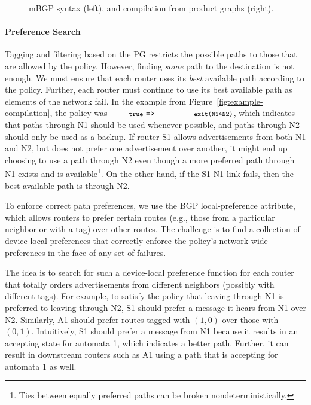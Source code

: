 \documentclass[numbers, 10pt, preprint]{sigplanconf}
\newcommand{\para}[1]{\paragraph*{\textbf{#1}}}
\newcommand{\CD}[1]{\texttt{\small #1}}
\newcommand{\KW}[1]{\texttt{\small\bfseries{#1}}}
\newcommand{\True}{\CD{true}}
\newcommand{\Prefer}{\texttt{>>}}
\newcommand{\Path}{\texttt{=>}}
\newcommand{\Exit}{\KW{exit}}
\begin{document}
\begin{figure}[t!]
  \vspace{1em}
  \hrulefill%
  \vspace{-.8em}
  \caption{mBGP syntax (left), and compilation from product graphs (right).}
  \label{fig:concretization}
  \vspace{-.4em}
\end{figure}%


\para{Preference Search}

Tagging and filtering based on the PG restricts the possible paths to those that are allowed by the policy. However, finding \emph{some} path to the destination is not enough. We must ensure that each router uses its \emph{best} available path according to the policy. Further, each router must continue to use its best available path as elements of the network fail. In the example from Figure~\ref{fig:example-compilation}, the policy was $\True ~\Path~ \CD{\Exit(N1\Prefer N2)}$, which indicates that paths through N1 should be used whenever possible, and paths through N2 should only be used as a backup. If router S1 allows advertisements from both N1 and N2, but does not prefer one advertisement over another, it might end up choosing to use a path through N2 even though a more preferred path through N1 exists and is available\footnote{Ties between equally preferred paths can be broken nondeterministically.}. On the other hand, if the S1-N1 link fails, then the best available path is through N2.

To enforce correct path preferences, we use the BGP local-preference attribute, which allows routers to prefer certain routes (e.g., those from a particular neighbor or with a tag) over other routes. The challenge is to find a collection of device-local preferences that correctly enforce the policy's network-wide preferences in the face of any set of failures.

The idea is to search for such a device-local preference function for each router that totally orders advertisements from different neighbors (possibly with different tags). For example, to satisfy the policy that leaving through N1 is preferred to leaving through N2, S1 should prefer a message it hears from N1 over N2. Similarly, A1 should prefer routes tagged with $(1,0)$ over those with $(0,1)$. Intuitively, S1 should prefer a message from N1 because it results in an accepting state for automata 1, which indicates a better path. Further, it can result in downstream routers such as A1 using a path that is accepting for automata 1 as well.
\end{document}
